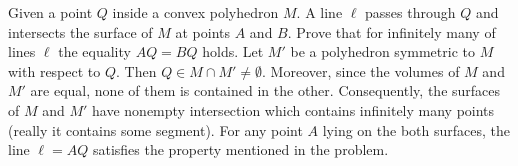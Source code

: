 \problem
Given a point $Q$ inside a convex polyhedron $M$.
A line $\ell$ passes through $Q$ and intersects the surface of $M$ at points
$A$ and $B$.
Prove that for infinitely many of lines $\ell$ the equality $AQ = BQ$ holds.
\solution
Let $M'$ be a polyhedron symmetric to $M$ with respect to $Q$.
Then $Q \in M \cap M' \neq \emptyset$.
Moreover, since the volumes of $M$ and $M'$ are equal, none of them is
contained in the other.
Consequently, the surfaces of $M$ and $M'$ have nonempty intersection which
contains infinitely many points (really it contains some segment).
For any point $A$ lying on the both surfaces, the line $\ell = AQ$
satisfies the property mentioned in the problem.
\endproblem
